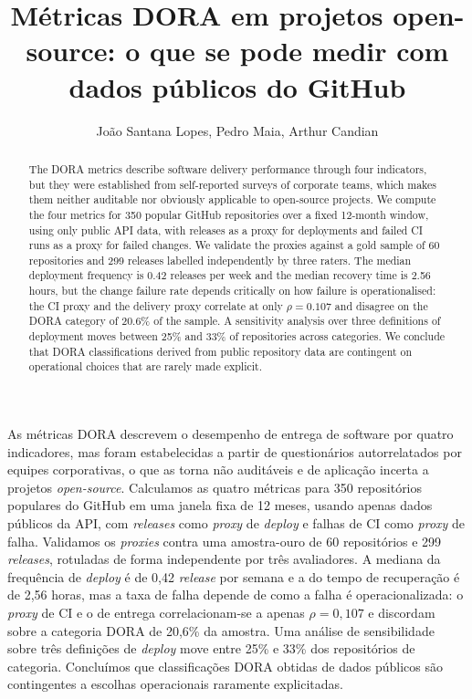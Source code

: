 \documentclass[12pt]{article}
\title{Métricas DORA em projetos open-source: o que se pode medir com dados públicos do
GitHub}
\author{João Santana Lopes\inst{1}, Pedro Maia\inst{1}, Arthur Candian\inst{1}}
\begin{document}
\maketitle

\begin{abstract}
The DORA metrics describe software delivery performance through four indicators, but they
were established from self-reported surveys of corporate teams, which makes them neither
auditable nor obviously applicable to open-source projects. We compute the four metrics for
350 popular GitHub repositories over a fixed 12-month window, using only public API data,
with releases as a proxy for deployments and failed CI runs as a proxy for failed changes. We
validate the proxies against a gold sample of 60 repositories and 299 releases labelled
independently by three raters. The median deployment frequency is 0.42 releases per week and
the median recovery time is 2.56 hours, but the change failure rate depends critically on how
failure is operationalised: the CI proxy and the delivery proxy correlate at only
$\rho = 0.107$ and disagree on the DORA category of 20.6\% of the sample. A sensitivity
analysis over three definitions of deployment moves between 25\% and 33\% of repositories
across categories. We conclude that DORA classifications derived from public repository data
are contingent on operational choices that are rarely made explicit.
\end{abstract}

\begin{resumo}
As métricas DORA descrevem o desempenho de entrega de software por quatro indicadores, mas
foram estabelecidas a partir de questionários autorrelatados por equipes corporativas, o que
as torna não auditáveis e de aplicação incerta a projetos \textit{open-source}. Calculamos as
quatro métricas para 350 repositórios populares do GitHub em uma janela fixa de 12 meses,
usando apenas dados públicos da API, com \textit{releases} como \textit{proxy} de
\textit{deploy} e falhas de CI como \textit{proxy} de falha. Validamos os \textit{proxies}
contra uma amostra-ouro de 60 repositórios e 299 \textit{releases}, rotuladas de forma
independente por três avaliadores. A mediana da frequência de \textit{deploy} é de 0,42
\textit{release} por semana e a do tempo de recuperação é de 2,56 horas, mas a taxa de falha
depende de como a falha é operacionalizada: o \textit{proxy} de CI e o de entrega
correlacionam-se a apenas $\rho = 0{,}107$ e discordam sobre a categoria DORA de 20,6\% da
amostra. Uma análise de sensibilidade sobre três definições de \textit{deploy} move entre
25\% e 33\% dos repositórios de categoria. Concluímos que classificações DORA obtidas de
dados públicos são contingentes a escolhas operacionais raramente explicitadas.
\end{resumo}
\end{document}

